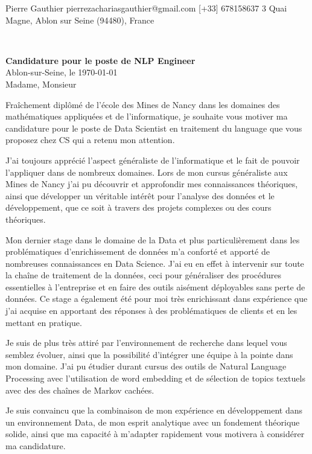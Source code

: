 \documentclass{cv_style}
\begin{document}
    {Pierre Gauthier}
    {{pierrezachariasgauthier@gmail.com}}
    {{[+33] 678158637}}
    {3 Quai Magne, Ablon sur Seine  (94480), France}


%
\vspace{3cm}\\
\begin{flushleft}
    \large
    \textbf{Candidature pour le poste de NLP Engineer}\\[0.2cm]
    Ablon-sur-Seine, le \today 
    \\[0.5cm]
    Madame, Monsieur
\end{flushleft}
\vspace{0.2cm}
\large
Fraîchement diplômé de l'école des Mines de Nancy dans les domaines des mathématiques appliquées et de l'informatique, je souhaite vous motiver ma candidature pour le poste de Data Scientist en traitement du language que vous proposez chez CS qui a retenu mon attention. 

J'ai toujours apprécié l'aspect généraliste de l'informatique et le fait de pouvoir l'appliquer dans de nombreux domaines. Lors de mon cursus généraliste aux Mines de Nancy j'ai pu découvrir et approfondir mes connaissances théoriques, ainsi que développer un véritable intérêt pour l'analyse des données et le développement, que ce soit à travers des projets complexes ou des cours théoriques. 

Mon dernier stage dans le domaine de la Data et	 plus particulièrement dans les problématiques d'enrichissement de données m'a  conforté et apporté de nombreuses connaissances en Data Science. J'ai eu en effet à intervenir sur toute la chaîne de traitement de la données, ceci pour généraliser des procédures  essentielles à l'entreprise et en faire des outils aisément déployables sans perte de données. Ce stage a également été pour moi très enrichissant dans expérience que j'ai acquise en apportant des réponses à des problématiques de clients et en les mettant en pratique.

Je suis de plus très attiré par l'environnement de recherche dans lequel vous semblez évoluer, ainsi que la possibilité d'intégrer une équipe à la pointe dans mon domaine. J'ai pu étudier durant cursus des outils de Natural Language Processing avec l'utilisation de word embedding et de sélection de topics textuels avec des des chaînes de Markov cachées.

Je suis convaincu que la combinaison de mon expérience en développement dans un environnement Data, de mon esprit analytique avec un fondement théorique solide, ainsi que ma capacité à m'adapter rapidement vous motivera à considérer ma candidature.
\end{document}
